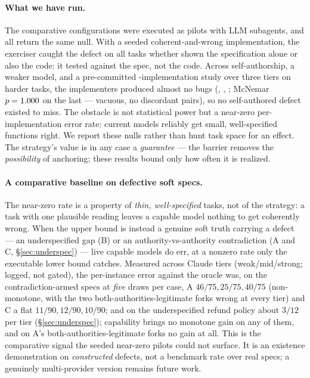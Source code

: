 \documentclass[11pt]{article}
\begin{document}
\paragraph{What we have run.} The comparative configurations were executed as pilots with LLM
subagents, and all return the same null. With a seeded coherent-and-wrong implementation, the
exerciser caught the defect on all \ResPilotTasks{} tasks whether shown the specification alone
or also the code: it tested against the spec, not the code. Across self-authorship, a weaker
model, and a pre-committed \ResStudyImpls{}-implementation study over three tiers on harder
tasks, the implementers produced almost no bugs (\ResPilotTwoBuggy{}, \ResPilotThreeBuggy{},
\ResStudyBuggy{}; McNemar $p=1.000{}$ on the last --- vacuous, no discordant pairs), so no
self-authored defect existed to miss. The obstacle is not statistical power but a near-zero
per-implementation error rate: current models reliably get small, well-specified functions
right. We report these nulls rather than hunt task space for an effect. The strategy's value is
in any case a \emph{guarantee} --- the barrier removes the \emph{possibility} of anchoring;
these results bound only how often it is realized.

\paragraph{A comparative baseline on defective soft specs.} The near-zero rate is a property of
\emph{thin, well-specified} tasks, not of the strategy: a task with one plausible reading leaves
a capable model nothing to get coherently wrong. When the upper bound is instead a genuine soft
truth carrying a defect --- an underspecified gap (B) or an authority-vs-authority contradiction
(A and C, \S\ref{sec:underspec}) --- live capable models do err, at a nonzero rate only the
executable lower bound catches. Measured across Claude tiers (weak/mid/strong; logged, not gated),
the per-instance error against the oracle was, on the contradiction-armed specs at \emph{five} draws
per case, A $46/75, 25/75, 40/75$ (non-monotone, with the two both-authorities-legitimate
forks wrong at every tier) and C a flat $11/90, 12/90, 10/90$; and on the underspecified refund
policy about $3/12$ per tier (\S\ref{sec:underspec}); capability brings no monotone gain on any of
them, and on A's both-authorities-legitimate forks no gain at all. This is the comparative signal the seeded near-zero pilots could not surface.
It is an existence demonstration on \emph{constructed} defects, not a benchmark rate over real
specs; a genuinely multi-provider version remains future work.
\end{document}
